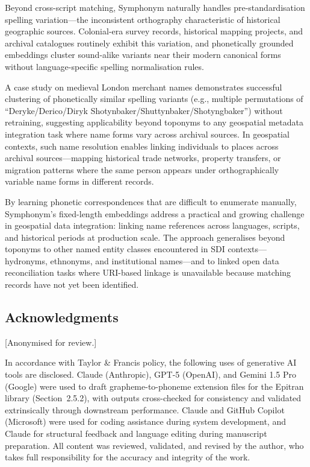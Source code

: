 \documentclass[11pt,a4paper]{article}
\begin{document}
Beyond cross-script matching, Symphonym naturally handles pre-standardisation spelling variation---the inconsistent orthography characteristic of historical geographic sources. Colonial-era survey records, historical mapping projects, and archival catalogues routinely exhibit this variation, and phonetically grounded embeddings cluster sound-alike variants near their modern canonical forms without language-specific spelling normalisation rules.

A case study on medieval London merchant names demonstrates successful clustering of phonetically similar spelling variants (e.g., multiple permutations of ``Deryke/Derico/Diryk Shotynbaker/Shuttynbaker/Shotyngbaker'') without retraining, suggesting applicability beyond toponyms to any geospatial metadata integration task where name forms vary across archival sources. In geospatial contexts, such name resolution enables linking individuals to places across archival sources—mapping historical trade networks, property transfers, or migration patterns where the same person appears under orthographically variable name forms in different records.

By learning phonetic correspondences that are difficult to enumerate manually, Symphonym's fixed-length embeddings address a practical and growing challenge in geospatial data integration: linking name references across languages, scripts, and historical periods at production scale. The approach generalises beyond toponyms to other named entity classes encountered in SDI contexts---hydronyms, ethnonyms, and institutional names---and to linked open data reconciliation tasks where URI-based linkage is unavailable because matching records have not yet been identified.

\subsection*{Acknowledgments}

[Anonymised for review.]

In accordance with Taylor \& Francis policy, the following uses of generative AI tools are disclosed. Claude (Anthropic), GPT-5 (OpenAI),
and Gemini 1.5 Pro (Google) were used to draft grapheme-to-phoneme extension files for the Epitran library (Section~2.5.2), with outputs cross-checked for consistency and validated extrinsically through downstream performance. Claude and GitHub Copilot (Microsoft) were used for coding assistance during system development, and Claude for structural feedback and language editing during manuscript preparation. All content was reviewed, validated, and revised by the author, who takes full responsibility for the accuracy and integrity of the work.
\end{document}
